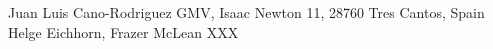 \usepackage{spconf}

\twoauthors
  {Juan Luis Cano-Rodriguez}
    {GMV, Isaac Newton 11, 28760 Tres Cantos, Spain}
  {Helge Eichhorn, Frazer McLean}
    {XXX}
